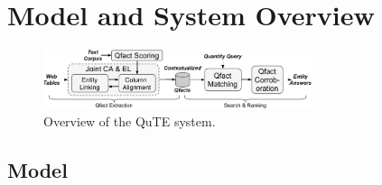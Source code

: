 
\section{Model and System Overview}
\label{sec:problem}
\label{sec:search}
\begin{figure}[t]

\centering
\includegraphics[width=0.7\textwidth]{figures/system_neu4}
	\vspace{-0.5em}
\caption{Overview of the 
QuTE
system.}
\label{fig:search_ov}
\end{figure}

\subsection{Model}
%
%


